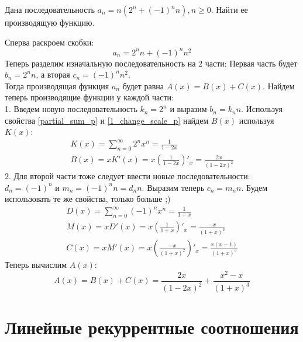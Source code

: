 \begin{task}
    Дана последовательность $a_n = n(2^n + (-1)^n n), n \geq 0$. Найти ее
    производящую функцию.
    \begin{solution}
        Сперва раскроем скобки: 
        \begin{equation*}
            a_n = 2^n n + (-1)^n n^2
        \end{equation*}
        Теперь разделим изначальную последовательность на 2 части:
        Первая часть будет $b_n = 2^n n$, а вторая $c_n = (-1)^n n^2$. \\
        Тогда производящая функция $a_n$ будет равна $A(x) = B(x) + C(x)$.
        Найдем теперь производящие функции у каждой части: \\
        1. Введем новую последовательность $k_n = 2^n$ и выразим $b_n = k_n n$.
        Используя свойства \ref{partial_sum_p} и \ref{1_change_scale_p} найдем $B(x)$ используя $K(x)$:
        \begin{gather*}
            K(x) = \sum_{n = 0}^{\infty} 2^n x^n = \frac{1}{1 - 2x} \\
            B(x) = xK'(x) = x (\frac{1}{1 - 2x})'_x = \frac{2x}{(1 - 2x)^2}
        \end{gather*}
        2. Для второй части тоже следует ввести новые последовательности:
        $d_n = (-1)^n$ и $m_n = (-1)^n n = d_n n$. Выразим теперь
        $c_n = m_n n$. Будем использовать те же свойства, только больше ;)
        \begin{gather*}
            D(x) = \sum_{n = 0}^{\infty}(-1)^n x^n = \frac{1}{1 + x} \\
            M(x) = x D'(x) = x (\frac{1}{1 + x})'_x = \frac{-x}{(1 + x)^2} \\
            C(x) = x M'(x) = x (\frac{-x}{(1 + x)^2})'_x = \frac{x(x - 1)}{(1 + x)^3}
        \end{gather*}
        Теперь вычислим $A(x)$:
        \begin{equation*}
            A(x) = B(x) + C(x) = \frac{2x}{(1 - 2x)^2} + \frac{x^2 - x}{(1 + x)^3}
        \end{equation*}
    \end{solution}
\end{task}

\section{Линейные рекуррентные соотношения}
